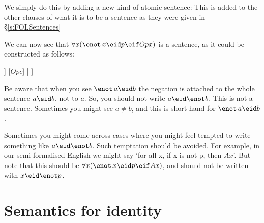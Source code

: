We simply do this by adding a new kind of atomic sentence: 
This is added to the other clauses of what it is to be a sentence as they were given in \S\ref{s:FOLSentences}

We can now see that $\forall x (\enot\, x\eid p \eif Opx)$ is a sentence, as it could be constructed as follows:	\begin{center}
	\begin{forest}
		[$\forall x (\enot\, x\eid p \eif Opx)$
			[$(\enot\, c\eid p\eif Opc)$
				[$\enot\, c\eid p$
					[$c\eid p$]
				]
				[$Opc$]
			]
		]
	\end{forest}
	\end{center}

Be aware that when you see $\enot\, a\eid b$ the negation is attached to the whole sentence $a\eid b$, not to $a$. So, you should not write $a\eid\enot b$. This is not a sentence. Sometimes you might see $a\neq b$, and this is short hand for $\enot\, a\eid b$.

Sometimes you might come across cases where you might feel tempted to write something like $a\eid\enot b$. Such temptation should be avoided. For example, in our semi-formalised English we might say `for all x, if x is not p, then $Ax$'. But note that this should be $\forall x(\enot\, x\eid p\eif Ax)$, and should not be written with $x\eid\enot p$.

\section{Semantics for identity}

%

